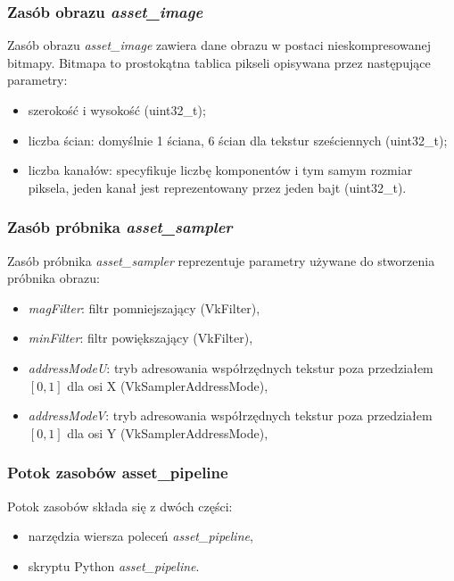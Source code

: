 \subsubsection{Zasób obrazu \textit{asset\_image}}
Zasób obrazu \textit{asset\_image} zawiera dane obrazu w postaci nieskompresowanej bitmapy.
Bitmapa to prostokątna tablica pikseli opisywana przez następujące parametry:
\begin{itemize}
	\item szerokość i wysokość (uint32\_t);
	\item liczba ścian: domyślnie 1 ściana, 6 ścian dla tekstur sześciennych (uint32\_t);
	\item liczba kanałów: specyfikuje liczbę komponentów i tym samym rozmiar piksela, jeden kanał jest reprezentowany przez jeden bajt (uint32\_t).
\end{itemize}

\subsubsection{Zasób próbnika \textit{asset\_sampler}}
Zasób próbnika \textit{asset\_sampler} reprezentuje parametry używane do stworzenia próbnika obrazu:
\begin{itemize}
	\item \textit{magFilter}: filtr pomniejszający (VkFilter),
	\item \textit{minFilter}: filtr powiększający (VkFilter),
	\item \textit{addressModeU}: tryb adresowania współrzędnych tekstur poza przedziałem $\left[0,1\right]$ dla osi X (VkSamplerAddressMode),
	\item \textit{addressModeV}: tryb adresowania współrzędnych tekstur poza przedziałem $\left[0,1\right]$ dla osi Y (VkSamplerAddressMode),
\end{itemize}

\subsubsection{Potok zasobów asset\_pipeline}
Potok zasobów składa się z dwóch części:
\begin{itemize}
	\item narzędzia wiersza poleceń \textit{asset\_pipeline},
	\item skryptu Python \textit{asset\_pipeline}.
\end{itemize}


